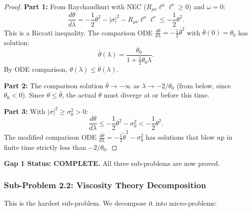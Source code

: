 \begin{proof}
\textbf{Part 1:} From Raychaudhuri with NEC ($R_{\mu\nu}\ell^\mu\ell^\nu \geq 0$) and $\omega = 0$:
\begin{equation}
    \frac{d\theta}{d\lambda} = -\frac{1}{2}\theta^2 - |\sigma|^2 - R_{\mu\nu}\ell^\mu\ell^\nu \leq -\frac{1}{2}\theta^2.
\end{equation}
This is a Riccati inequality. The comparison ODE $\frac{d\bar{\theta}}{d\lambda} = -\frac{1}{2}\bar{\theta}^2$ with $\bar{\theta}(0) = \theta_0$ has solution:
\begin{equation}
    \bar{\theta}(\lambda) = \frac{\theta_0}{1 + \frac{1}{2}\theta_0\lambda}.
\end{equation}
By ODE comparison, $\theta(\lambda) \leq \bar{\theta}(\lambda)$.

\textbf{Part 2:} The comparison solution $\bar{\theta} \to -\infty$ as $\lambda \to -2/\theta_0$ (from below, since $\theta_0 < 0$). Since $\theta \leq \bar{\theta}$, the actual $\theta$ must diverge at or before this time.

\textbf{Part 3:} With $|\sigma|^2 \geq \sigma_0^2 > 0$:
\begin{equation}
    \frac{d\theta}{d\lambda} \leq -\frac{1}{2}\theta^2 - \sigma_0^2 < -\frac{1}{2}\theta^2.
\end{equation}
The modified comparison ODE $\frac{d\tilde{\theta}}{d\lambda} = -\frac{1}{2}\tilde{\theta}^2 - \sigma_0^2$ has solutions that blow up in finite time strictly less than $-2/\theta_0$.
\end{proof}

\textbf{Gap 1 Status: COMPLETE.} All three sub-problems are now proved.

\subsubsection{Sub-Problem 2.2: Viscosity Theory Decomposition}

This is the hardest sub-problem. We decompose it into micro-problems:

\begin{center}
\end{center}

